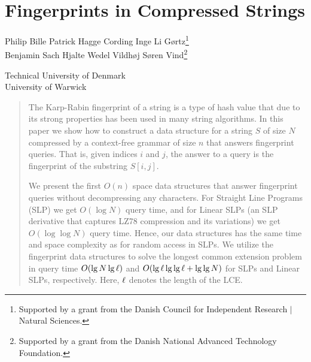 \chapter{Fingerprints in Compressed Strings}\label{chp:fingerprints}

\begin{infosection}
    \begin{authors}
        Philip Bille \qquad Patrick Hagge Cording \qquad Inge Li G{\o}rtz\footnote{Supported by a grant from the Danish Council for Independent Research $\vert$ Natural Sciences.}\\
        Benjamin Sach \qquad Hjalte Wedel Vildh{\o}j \qquad S{\o}ren Vind\footnote{Supported by a grant from the Danish National Advanced Technology Foundation.}
    \end{authors}

    \begin{uninames}
         Technical University of Denmark \\
         University of Warwick
    \end{uninames}

    \begin{abstract}
    The Karp-Rabin fingerprint of a string is a type of hash value that due to its strong properties has been used in many string algorithms. In this paper we show how to construct a data structure for a string $S$ of size $N$ compressed by a context-free grammar of size $n$ that answers fingerprint queries. That is, given indices $i$ and $j$, the answer to a query is the fingerprint of the substring $S[i,j]$. 
    
    We present the first $O(n)$ space data structures that answer fingerprint queries without decompressing any characters. For Straight Line Programs (SLP) we get $O(\log N)$ query time, and for Linear SLPs (an SLP derivative that captures LZ78 compression and its variations) we get $O(\log \log N)$ query time. Hence, our data structures has the same time and space complexity as for random access in SLPs. We utilize the fingerprint data structures to solve the longest common extension problem in query time $O(\lg N\lg \ell)$ and $O(\lg \ell \lg\lg \ell + \lg\lg N)$ for SLPs and Linear SLPs, respectively. Here, $\ell$ denotes the length of the LCE.
    \end{abstract}
\end{infosection}


